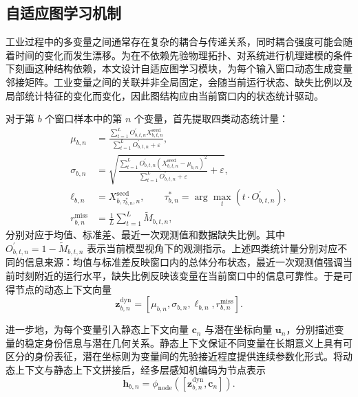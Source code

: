 \documentclass[bachelor, vlined]{DissertUESTC}
\begin{document}
    \subsection{自适应图学习机制}

    工业过程中的多变量之间通常存在复杂的耦合与传递关系，同时耦合强度可能会随着时间的变化而发生漂移。为在不依赖先验物理拓扑、对系统进行机理建模的条件下刻画这种结构依赖，本文设计自适应图学习模块，为每个输入窗口动态生成变量邻接矩阵。工业变量之间的关联并非全局固定，会随当前运行状态、缺失比例以及局部统计特征的变化而变化，因此图结构应由当前窗口内的状态统计驱动。

    对于第 $b$ 个窗口样本中的第 $n$ 个变量，首先提取四类动态统计量：
    \begin{align}
        \mu_{b,n} &= \frac{\sum_{t=1}^{L} O_{b,t,n}^{\prime} X_{b,t,n}^{\mathrm{seed}}}{\sum_{t=1}^{L} O_{b,t,n}^{\prime} + \varepsilon}, \\
        \sigma_{b,n} &= \sqrt{\frac{\sum_{t=1}^{L} O_{b,t,n}^{\prime} \left(X_{b,t,n}^{\mathrm{seed}}-\mu_{b,n}\right)^2}{\sum_{t=1}^{L} O_{b,t,n}^{\prime} + \varepsilon} + \varepsilon}, \\
        \ell_{b,n} &= X_{b,\tau_{b,n}^{\ast},n}^{\mathrm{seed}}, \qquad \tau_{b,n}^{\ast} = \arg\max_t \left(t \cdot O_{b,t,n}^{\prime}\right), \\
        r_{b,n}^{\mathrm{miss}} &= \frac{1}{L}\sum_{t=1}^{L} \widetilde{M}_{b,t,n},
    \end{align}
    分别对应于均值、标准差、最近一次观测值和数据缺失比例。其中 $O_{b,t,n}^{\prime}=1-\widetilde{M}_{b,t,n}$ 表示当前模型视角下的观测指示。上述四类统计量分别对应不同的信息来源：均值与标准差反映窗口内的总体分布状态，最近一次观测值强调当前时刻附近的运行水平，缺失比例反映该变量在当前窗口中的信息可靠性。于是可得节点的动态上下文向量
    \begin{equation}
        \mathbf{z}_{b,n}^{\mathrm{dyn}} =
        [\mu_{b,n},\sigma_{b,n},\ell_{b,n},r_{b,n}^{\mathrm{miss}}].
    \end{equation}

    进一步地，为每个变量引入静态上下文向量 $\mathbf{c}_n$ 与潜在坐标向量 $\mathbf{u}_n$，分别描述变量的稳定身份信息与潜在几何关系。静态上下文保证不同变量在长期意义上具有可区分的身份表征，潜在坐标则为变量间的先验接近程度提供连续参数化形式。将动态上下文与静态上下文拼接后，经多层感知机编码为节点表示
    \begin{equation}
        \mathbf{h}_{b,n} = \phi_{\mathrm{node}}\!\left([\mathbf{z}_{b,n}^{\mathrm{dyn}},\mathbf{c}_n]\right).
    \end{equation}
\end{document}
